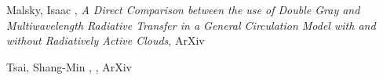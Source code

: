 \item[{\color{numcolor}\scriptsize2}] Malsky, Isaac , \emph{A Direct Comparison between the use of Double Gray and Multiwavelength Radiative Transfer in a General Circulation Model with and without Radiatively Active Clouds}, ArXiv

\item[{\color{numcolor}\scriptsize1}] Tsai, Shang-Min , , ArXiv